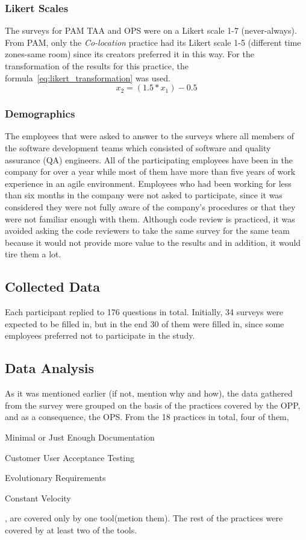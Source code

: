 \subsubsection{Likert Scales}
The surveys for PAM TAA and OPS were on a Likert scale 1-7 (never-always). From PAM, only the \textit{Co-location} practice had its Likert scale 1-5 (different time zones-same room) since its creators preferred it in this way. For the transformation of the results for this practice, the formula~\eqref{eq:likert_transformation} \cite{likert_transformation} was used.  \begin{equation} \label{eq:likert_transformation} x_2 = (1.5 * x_1) - 0.5 \end{equation} 

\subsubsection{Demographics} %
The employees that were asked to answer to the surveys where all members of the software development teams which consisted of software and quality assurance (QA) engineers. All of the participating employees have been in the company for over a year while most of them have more than five years of work experience in an agile environment. Employees who had been working for less than six months in the company were not asked to participate, since it was considered they were not fully aware of the company's procedures or that they were not familiar enough with them. Although code review is practiced, it was avoided asking the code reviewers to take the same survey for the same team because it would not provide more value to the results and in addition, it would tire them a lot.

\subsection{Collected Data}
Each participant replied to 176 questions in total. Initially, 34 surveys were expected to be filled in, but in the end 30 of them were filled in, since some employees preferred not to participate in the study.

\subsection{Data Analysis}
As it was mentioned earlier (if not, mention why and how), the data gathered from the survey were grouped on the basis of the practices covered by the OPP, and as a consequence, the OPS. From the 18 practices in total, four of them, \begin{inparaenum} [a\upshape)] \item Minimal or Just Enough Documentation \item Customer User Acceptance Testing \item Evolutionary Requirements \item Constant Velocity \end{inparaenum}, are covered only by one tool(metion them). The rest of the practices were covered by at least two of the tools.

